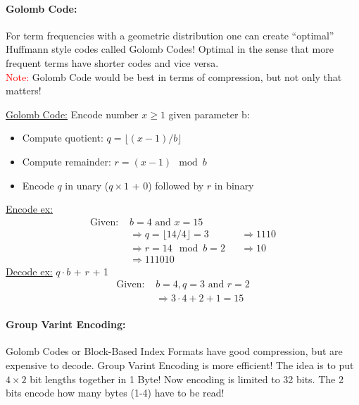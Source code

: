 \documentclass[a4paper,11pt]{article}
\begin{document}
\begin{multicols}{2}
\paragraph{Golomb Code:} For term frequencies with a geometric distribution one can create ``optimal'' Huffmann style codes called Golomb Codes! Optimal in the sense that more frequent terms have shorter codes and vice versa. \\
\textcolor{red}{Note:} Golomb Code would be best in terms of compression, but not only that matters!
\begin{addmargin}[0.28cm]{0cm} %
  \underline{Golomb Code:} Encode number $x \geq 1$ given parameter b:
  \begin{itemize}
    \item Compute quotient: $q = \lfloor (x-1)/b \rfloor$
    \item Compute remainder: $r = (x-1) \mod b$
    \item Encode $q$ in unary ($q \times 1$ + 0) followed by $r$ in binary
  \end{itemize}
  \underline{Encode ex:}
  \begin{align*}
    \text{Given: } &b = 4 \text{ and } x = 15 \\
                   &\Rightarrow q = \lfloor 14 / 4 \rfloor = 3 &&\Rightarrow 1110\\
                   &\Rightarrow r = 14 \mod b = 2 &&\Rightarrow 10 \\
                   &\Rightarrow 111010
  \end{align*}
  \underline{Decode ex:} $q \cdot b$ + $r$ + 1
  \begin{align*}
    \text{Given: } &b = 4, q = 3 \text{ and } r = 2 \\
                  &\Rightarrow 3 \cdot 4 + 2 + 1 = 15
  \end{align*}
\end{addmargin}

\paragraph{Group Varint Encoding:} Golomb Codes or Block-Based Index Formats have good compression, but are expensive to decode. Group Varint Encoding is more efficient! The idea is to put $4 \times 2$ bit lengths together in 1 Byte! Now encoding is limited to 32 bits. The 2 bits encode how many bytes (1-4) have to be read!


\end{multicols}
\end{document}
